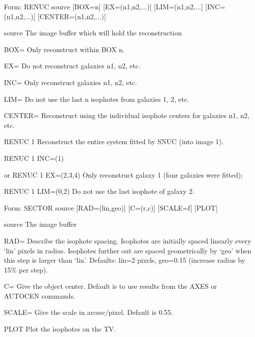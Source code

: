 {\newpage\clearpage
{}%
\begin{command} 
  \item[Form: RENUC source {[BOX=n]} {[EX=(n1,n2,...)]} {[LIM=(n1,n2,...]}
       {[INC=(n1,n2,...)]} {[CENTER=(n1,n2,...)]}\hfill]{}
  \item[source]{The image buffer which will hold the reconstruction}
  \item[BOX=]{Only reconstruct within BOX n.}
  \item[EX=]{Do not reconstruct galaxies n1, n2, etc.}
  \item[INC=]{Only reconstruct galaxies n1, n2, etc.}
  \item[LIM=]{Do not use the last n isophotes from galaxies 1, 2, etc.}
  \item[CENTER=]{Reconstruct using the individual isophote centers for
       galaxies n1, n2, etc.}
\end{command}%
\lthtmlfigureZ
\lthtmlcheckvsize\clearpage}

{\newpage\clearpage
{}%
\begin{example}
  \item[RENUC 1\hfill]{Reconstruct the entire system fitted by SNUC (into
       image 1).}
\par
\item[RENUC 1 INC=(1) \hfill]{}
\par
\item[or RENUC 1 EX=(2,3,4)\hfill]{Only reconstruct galaxy 1 (four
       galaxies were fitted);}
\par
\item[RENUC 1 LIM=(0,2)\hfill]{Do not use the last isophote of galaxy 2.}
\end{example}%
\lthtmlfigureZ
\lthtmlcheckvsize\clearpage}

{\newpage\clearpage
{}%
\begin{command}
  \item[Form: SECTOR source {[RAD=(lin,geo)]} {[C=(r,c)]} {[SCALE=f]} 
       {[PLOT]}\hfill]{}
  \item[source]{The image buffer}
  \item[RAD=]{Describe the isophote spacing. Isophotes are initially spaced
       linearly every `lin' pixels in radius. Isophotes further out are
       spaced geometrically by `geo' when this step is larger than `lin'.
       Defaults: lin=2 pixels, geo=0.15 (increase radius by 15\% per
       step).}
  \item[C=]{Give the object center.  Default is to use results from
       the AXES or AUTOCEN commands.}
  \item[SCALE=]{Give the scale in arcsec/pixel. Default is 0.55.}
  \item[PLOT]{Plot the isophotes on the TV.}
\end{command}%
\lthtmlfigureZ
\lthtmlcheckvsize\clearpage}

